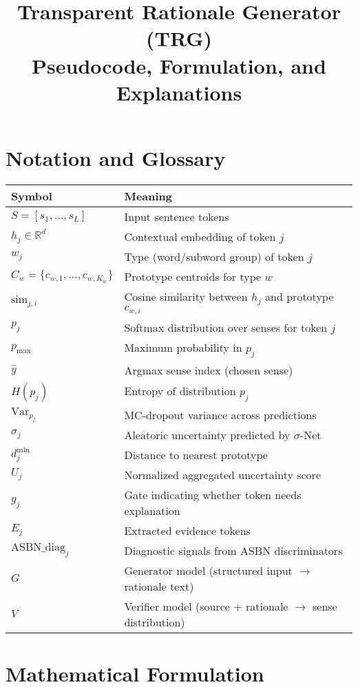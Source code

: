 \documentclass[a4paper,11pt]{article}
\title{Transparent Rationale Generator (TRG) \\ Pseudocode, Formulation, and Explanations}
\author{}
\date{}
\begin{document}
\maketitle

\section{Notation and Glossary}

\begin{tabular}{ll}
\toprule
Symbol & Meaning \\
\midrule
$S = [s_1, \dots, s_L]$ & Input sentence tokens \\
$h_j \in \mathbb{R}^d$ & Contextual embedding of token $j$ \\
$w_j$ & Type (word/subword group) of token $j$ \\
$C_w = \{c_{w,1}, \dots, c_{w,K_w}\}$ & Prototype centroids for type $w$ \\
$\text{sim}_{j,i}$ & Cosine similarity between $h_j$ and prototype $c_{w,i}$ \\
$p_j$ & Softmax distribution over senses for token $j$ \\
$p_{\max}$ & Maximum probability in $p_j$ \\
$\hat{y}$ & Argmax sense index (chosen sense) \\
$H(p_j)$ & Entropy of distribution $p_j$ \\
$\text{Var}_{p_j}$ & MC-dropout variance across predictions \\
$\sigma_j$ & Aleatoric uncertainty predicted by $\sigma$-Net \\
$d^{\min}_j$ & Distance to nearest prototype \\
$U_j$ & Normalized aggregated uncertainty score \\
$g_j$ & Gate indicating whether token needs explanation \\
$E_j$ & Extracted evidence tokens \\
$\text{ASBN\_diag}_j$ & Diagnostic signals from ASBN discriminators \\
$G$ & Generator model (structured input $\to$ rationale text) \\
$V$ & Verifier model (source + rationale $\to$ sense distribution) \\
\bottomrule
\end{tabular}

\section{Mathematical Formulation}
\end{document}
